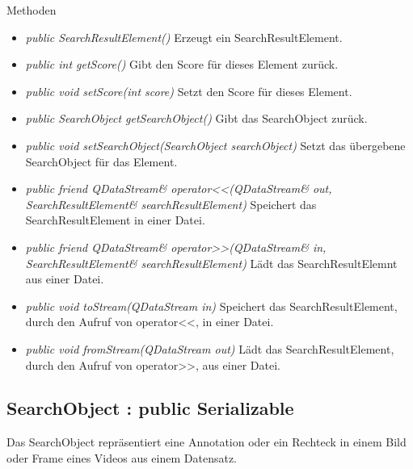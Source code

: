 Methoden
\begin{itemize}
\item \textit{public SearchResultElement()} Erzeugt ein SearchResultElement.
\item \textit{public int getScore()} Gibt den Score für dieses Element zurück.
\item \textit{public void setScore(int score)} Setzt den Score für dieses Element.
\item \textit{public SearchObject getSearchObject()} Gibt das SearchObject zurück.
\item \textit{public void setSearchObject(SearchObject searchObject)} Setzt das übergebene SearchObject für das Element.
\item \textit{public friend QDataStream\& operator<<(QDataStream\& out, SearchResultElement\& searchResultElement)} Speichert das SearchResultElement in einer Datei.
\item \textit{public friend QDataStream\& operator>>(QDataStream\& in, SearchResultElement\& searchResultElement)} Lädt das SearchResultElemnt aus einer Datei.
\item \textit{public void toStream(QDataStream in)} Speichert das SearchResultElement, durch den Aufruf von operator<<, in einer Datei.
\item \textit{public void fromStream(QDataStream out)} Lädt das SearchResultElement, durch den Aufruf von operator>>, aus einer Datei.
\end{itemize}

\subsection*{SearchObject : public Serializable}
Das SearchObject repräsentiert eine Annotation oder ein Rechteck in einem Bild oder Frame eines Videos aus einem Datensatz.


